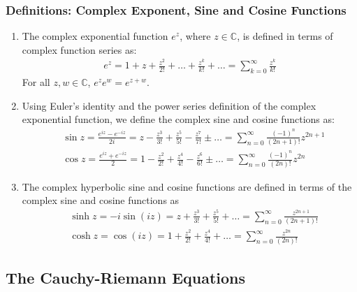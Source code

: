 \documentclass[11pt, a4paper]{article}
\newcommand{\C}{\mathbb{C}} %
\begin{document}
\subsubsection{Definitions: Complex Exponent, Sine and Cosine Functions}
\begin{enumerate}
	\item The complex exponential function $ e^{z} $, where $ z \in \C $, is defined in terms of complex function series as:
	\begin{align*}
		e^{z} = 1 + z + \frac{z^2}{2!} + \dots + \frac{z^{k}}{k!} + \dots = \sum_{k=0}^{\infty}\frac{z^{k}}{k!}
	\end{align*}
	For all $ z, w \in \C $, $ e^{z}e^{w} = e^{z + w} $.
	
	\item Using Euler's identity and the power series definition of the complex exponential function, we define the complex sine and cosine functions as:
	\begin{align*}
		&\sin z = \frac{e^{iz} - e^{-iz}}{2i} = z - \frac{z^3}{3!} + \frac{z^5}{5!} - \frac{z^7}{7!} \pm \dots =  \sum^{\infty}_{n=0} \frac{(-1)^n}{(2n+1)!} z^{2n+1}\\
		&\cos z = \frac{e^{iz} + e^{-iz}}{2} =  1 - \frac{z^2}{2!} + \frac{z^4}{4!} - \frac{z^6}{6!} \pm \dots =  \sum^{\infty}_{n=0} \frac{(-1)^n}{(2n)!} z^{2n}
	\end{align*}
	
	\item The complex hyperbolic sine and cosine functions are defined in terms of the complex sine and cosine functions as
	\begin{align*}
		&\sinh z = -i \sin (iz)  = z + \frac{z^3}{3!} + \frac{z^5}{5!} + \dots =  \sum^{\infty}_{n=0} \frac{z^{2n+1}}{(2n+1)!} \\
		&\cosh z = \cos (iz) = 1 + \frac{z^2}{2!} + \frac{z^4}{4!} + \dots =  \sum^{\infty}_{n=0} \frac{z^{2n}}{(2n)!} 
	\end{align*}
\end{enumerate}

\subsection{The Cauchy-Riemann Equations}
\end{document}

